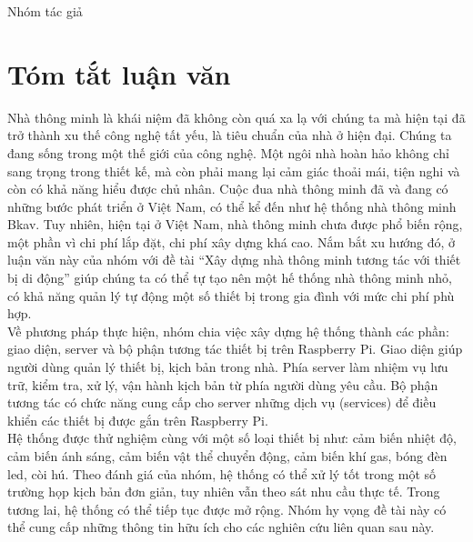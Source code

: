 \documentclass[12pt,a4paper,oneside]{extbook}
\begin{document}
\hspace{11cm}Nhóm tác giả


\chapter*{Tóm tắt luận văn}
\noindent
Nhà thông minh là khái niệm đã không còn quá xa lạ với chúng ta mà hiện tại 
đã trở thành xu thế công nghệ tất yếu, là tiêu chuẩn của nhà ở hiện đại. 
Chúng ta đang sống trong một thế giới của công nghệ. Một ngôi nhà hoàn hảo 
không chỉ sang trọng trong thiết kế, mà còn phải mang lại cảm giác thoải mái, tiện nghi và còn có khả năng hiểu được chủ nhân. Cuộc đua nhà thông minh đã và đang có những bước phát triển ở Việt Nam, có thể kể đến như hệ thống nhà thông minh Bkav. Tuy nhiên, hiện tại ở Việt Nam, nhà thông minh chưa được phổ biến rộng, một phần vì chi phí lắp đặt, chi phí xây dựng khá cao. Nắm bắt xu hướng đó, ở luận văn này của nhóm với đề tài “Xây dựng nhà thông minh tương tác với thiết bị di động” giúp chúng ta có thể tự tạo nên một hế thống nhà thông minh nhỏ, có khả năng quản lý tự động một số thiết bị trong gia đình với mức chi phí phù hợp.\\

\noindent
Về phương pháp thực hiện, nhóm chia việc xây dựng hệ thống thành các phần: giao diện, server và bộ phận tương tác thiết bị trên Raspberry Pi. Giao diện giúp người dùng quản lý thiết bị, kịch bản trong nhà. Phía server làm nhiệm vụ lưu trữ, kiểm tra, xử lý, vận hành kịch bản từ phía người dùng yêu cầu. Bộ phận tương tác có chức năng cung cấp cho server những dịch vụ (services) để điều khiển các thiết bị được gắn trên Raspberry Pi.\\

\noindent
Hệ thống được thử nghiệm cùng với một số loại thiết bị như: cảm biến nhiệt độ, cảm biến ánh sáng, cảm biến vật thể chuyển động, cảm biến khí gas, bóng đèn led, còi hú. Theo đánh giá của nhóm, hệ thống có thể xử lý tốt trong một số trường họp kịch bản đơn giản, tuy nhiên vẫn theo sát nhu cầu thực tế. Trong tương lai, hệ thống có thể tiếp tục được mở rộng. Nhóm hy vọng đề tài này có thể cung cấp những thông tin hữu ích cho các nghiên cứu liên quan sau này.

\begingroup
\let\cleardoublepage\clearpage
\tableofcontents 
% 
\endgroup
\end{document}
